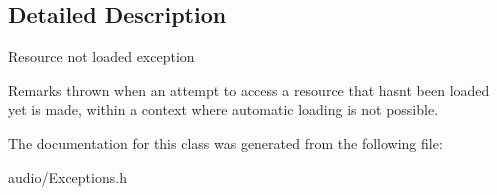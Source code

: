 \subsection{Detailed Description}
Resource not loaded exception \begin{DoxyRemark}{Remarks}
thrown when an attempt to access a resource that hasn\textquotesingle{}t been loaded yet is made, within a context where automatic loading is not possible. 
\end{DoxyRemark}


The documentation for this class was generated from the following file\+:\begin{DoxyCompactItemize}
\item 
audio/Exceptions.\+h\end{DoxyCompactItemize}
